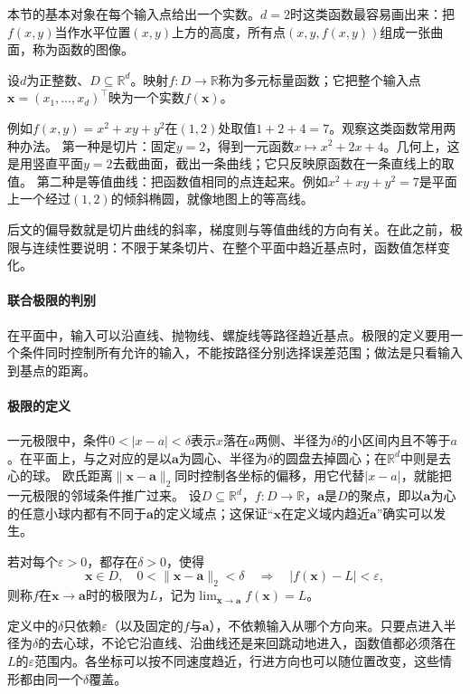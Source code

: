 本节的基本对象在每个输入点给出一个实数。$d=2$时这类函数最容易画出来：把$f(x,y)$当作水平位置$(x,y)$上方的高度，所有点$(x,y,f(x,y))$组成一张曲面，称为函数的图像。
\begin{definition}[多元标量函数]
\label{def:multivariable-scalar-function}
设$d$为正整数、$D\subseteq\mathbb R^d$。映射$f:D\to\mathbb R$称为多元标量函数；它把整个输入点$\bm x=(x_1,\ldots,x_d)^\top$映为一个实数$f(\bm x)$。
\end{definition}
例如$f(x,y)=x^2+xy+y^2$在$(1,2)$处取值$1+2+4=7$。观察这类函数常用两种办法。
第一种是切片：固定$y=2$，得到一元函数$x\mapsto x^2+2x+4$。几何上，这是用竖直平面$y=2$去截曲面，截出一条曲线；它只反映原函数在一条直线上的取值。
第二种是等值曲线：把函数值相同的点连起来。例如$x^2+xy+y^2=7$是平面上一个经过$(1,2)$的倾斜椭圆，就像地图上的等高线。

后文的偏导数就是切片曲线的斜率，梯度则与等值曲线的方向有关。在此之前，极限与连续性要说明：不限于某条切片、在整个平面中趋近基点时，函数值怎样变化。

\paragraph{联合极限的判别}

在平面中，输入可以沿直线、抛物线、螺旋线等路径趋近基点。极限的定义要用一个条件同时控制所有允许的输入，不能按路径分别选择误差范围；做法是只看输入到基点的距离。
\paragraph{极限的定义}
\label{sec:multivariable-joint-limits}

一元极限中，条件$0<|x-a|<\delta$表示$x$落在$a$两侧、半径为$\delta$的小区间内且不等于$a$。在平面上，与之对应的是以$\bm a$为圆心、半径为$\delta$的圆盘去掉圆心；在$\mathbb R^d$中则是去心的球。
欧氏距离$\lVert\bm x-\bm a\rVert_2$同时控制各坐标的偏移，用它代替$|x-a|$，就能把一元极限的邻域条件推广过来。
设$D\subseteq\mathbb R^d$，$f:D\to\mathbb R$，$\bm a$是$D$的聚点，即以$\bm a$为心的任意小球内都有不同于$\bm a$的定义域点；这保证“$\bm x$在定义域内趋近$\bm a$”确实可以发生。
\begin{definition}[多元函数的极限]
\label{def:multivariable-limit}
若对每个$\varepsilon>0$，都存在$\delta>0$，使得
\[
 \bm x\in D,\quad 0<\lVert\bm x-\bm a\rVert_2<\delta
 \quad\Longrightarrow\quad |f(\bm x)-L|<\varepsilon,
\]
则称$f$在$\bm x\to\bm a$时的极限为$L$，记为$\lim_{\bm x\to\bm a}f(\bm x)=L$。
\end{definition}
定义中的$\delta$只依赖$\varepsilon$（以及固定的$f$与$\bm a$），不依赖输入从哪个方向来。只要点进入半径为$\delta$的去心球，不论它沿直线、沿曲线还是来回跳动地进入，函数值都必须落在$L$的$\varepsilon$范围内。各坐标可以按不同速度趋近，行进方向也可以随位置改变，这些情形都由同一个$\delta$覆盖。

